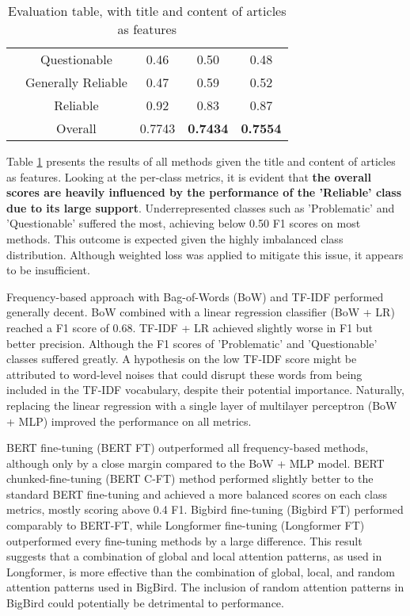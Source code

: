\begin{table}[htbp]
\begin{longtable}{| c | c | c | c | c |}
                                                          & Questionable       & 0.46               & 0.50            & 0.48            \\
                                                          & Generally Reliable & 0.47               & 0.59            & 0.52            \\
                                                          & Reliable           & 0.92               & 0.83            & 0.87            \\\cline{2-5}
                                                          & Overall            & 0.7743             & \textbf{0.7434} & \textbf{0.7554} \\
        \hline
    \end{longtable}
    \caption{Evaluation table, with title and content of articles as features}
    \label{table:eval}
\end{table}

Table \ref{table:eval} presents the results of all methods given the title and content of articles as features. Looking at the per-class metrics, it is evident that \textbf{the overall scores are heavily influenced by the performance of the 'Reliable' class due to its large support}. Underrepresented classes such as 'Problematic' and 'Questionable' suffered the most, achieving below 0.50 F1 scores on most methods. This outcome is expected given the highly imbalanced class distribution. Although weighted loss was applied to mitigate this issue, it appears to be insufficient.

Frequency-based approach with Bag-of-Words (BoW) and TF-IDF performed generally decent. BoW combined with a linear regression classifier (BoW + LR) reached a F1 score of 0.68. TF-IDF + LR achieved slightly worse in F1 but better precision. Although the F1 scores of 'Problematic' and 'Questionable' classes suffered greatly. A hypothesis on the low TF-IDF score might be attributed to word-level noises that could disrupt these words from being included in the TF-IDF vocabulary, despite their potential importance. Naturally, replacing the linear regression with a single layer of multilayer perceptron (BoW + MLP) improved the performance on all metrics.

BERT fine-tuning (BERT FT) outperformed all frequency-based methods, although only by a close margin compared to the BoW + MLP model. BERT chunked-fine-tuning (BERT C-FT) method performed slightly better to the standard BERT fine-tuning and achieved a more balanced scores on each class metrics, mostly scoring above 0.4 F1. Bigbird fine-tuning (Bigbird FT) performed comparably to BERT-FT, while Longformer fine-tuning (Longformer FT) outperformed every fine-tuning methods by a large difference. This result suggests that a combination of global and local attention patterns, as used in Longformer, is more effective than the combination of global, local, and random attention patterns used in BigBird. The inclusion of random attention patterns in BigBird could potentially be detrimental to performance.

